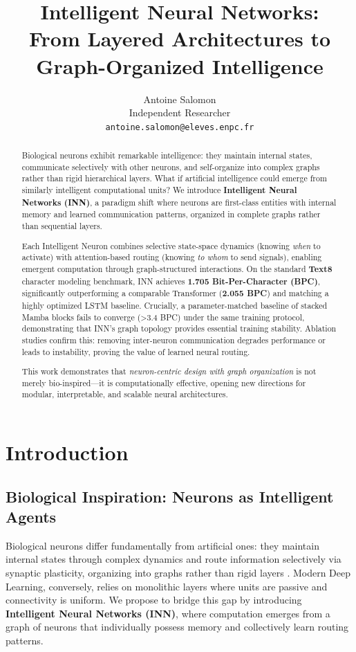\documentclass{article}
\title{Intelligent Neural Networks: \\From Layered Architectures to Graph-Organized Intelligence}
\author{
  Antoine Salomon \\
  Independent Researcher \\
  \texttt{antoine.salomon@eleves.enpc.fr}
}
\begin{document}
\maketitle

\begin{abstract}
Biological neurons exhibit remarkable intelligence: they maintain internal states, communicate selectively with other neurons, and self-organize into complex graphs rather than rigid hierarchical layers. What if artificial intelligence could emerge from similarly intelligent computational units? We introduce \textbf{Intelligent Neural Networks (INN)}, a paradigm shift where neurons are first-class entities with internal memory and learned communication patterns, organized in complete graphs rather than sequential layers.

Each Intelligent Neuron combines selective state-space dynamics (knowing \emph{when} to activate) with attention-based routing (knowing \emph{to whom} to send signals), enabling emergent computation through graph-structured interactions. On the standard \textbf{Text8} character modeling benchmark, INN achieves \textbf{1.705 Bit-Per-Character (BPC)}, significantly outperforming a comparable Transformer (\textbf{2.055 BPC}) and matching a highly optimized LSTM baseline. Crucially, a parameter-matched baseline of stacked Mamba blocks fails to converge (>3.4 BPC) under the same training protocol, demonstrating that INN's graph topology provides essential training stability. Ablation studies confirm this: removing inter-neuron communication degrades performance or leads to instability, proving the value of learned neural routing.

This work demonstrates that \emph{neuron-centric design with graph organization} is not merely bio-inspired—it is computationally effective, opening new directions for modular, interpretable, and scalable neural architectures.
\end{abstract}
\newpage
\section{Introduction}

\subsection{Biological Inspiration: Neurons as Intelligent Agents}

Biological neurons differ fundamentally from artificial ones: they maintain internal states through complex dynamics and route information selectively via synaptic plasticity, organizing into graphs rather than rigid layers \cite{gerstner2014neuronal}. Modern Deep Learning, conversely, relies on monolithic layers where units are passive and connectivity is uniform. We propose to bridge this gap by introducing \textbf{Intelligent Neural Networks (INN)}, where computation emerges from a graph of neurons that individually possess memory and collectively learn routing patterns.
\end{document}
